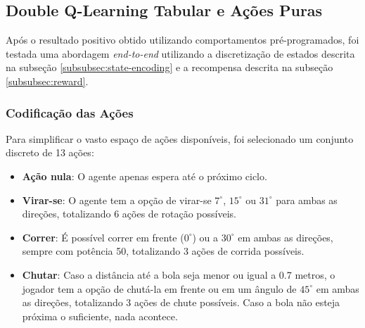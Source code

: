 \subsection{Double Q-Learning Tabular e Ações Puras}




Após o resultado positivo obtido utilizando comportamentos pré-programados, foi testada uma abordagem \textit{end-to-end} utilizando a discretização de estados descrita na subseção \ref{subsubsec:state-encoding} e a recompensa descrita na subseção \ref{subsubsec:reward}.


\subsubsection{Codificação das Ações}

Para simplificar o vasto espaço de ações disponíveis, foi selecionado um conjunto discreto de 13 ações:

\begin{itemize}
	\item \textbf{Ação nula}: O agente apenas espera até o próximo ciclo.
	
	\item \textbf{Virar-se}: O agente tem a opção de virar-se $7^{\circ}$, $15^{\circ}$ ou $31^{\circ}$ para ambas as direções, totalizando 6 ações de rotação possíveis. 
	
	\item \textbf{Correr}: É possível correr em frente ($0^{\circ}$) ou a $30^{\circ}$ em ambas as direções, sempre com potência 50, totalizando 3 ações de corrida possíveis.
	
	\item \textbf{Chutar}: Caso a distância até a bola seja menor ou igual a 0.7 metros, o jogador tem a opção de chutá-la em frente ou em um ângulo de $45^{\circ}$ em ambas as direções, totalizando 3 ações de chute possíveis. Caso a bola não esteja próxima o suficiente, nada acontece.
\end{itemize}

